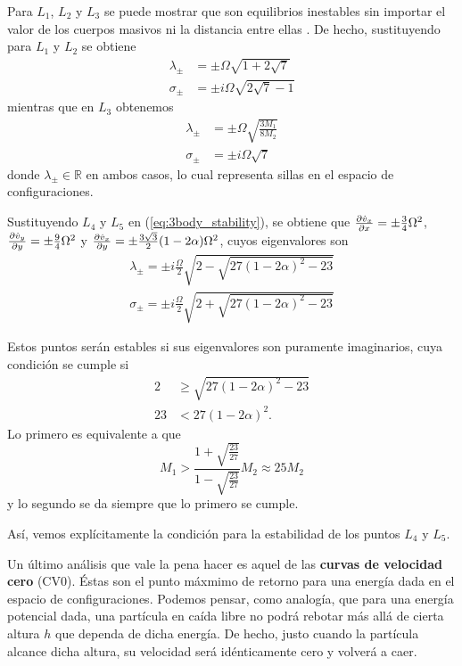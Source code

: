 Para $L_1$, $L_2$ y $L_3$ se puede mostrar que son equilibrios inestables sin importar el valor de los cuerpos masivos ni la distancia entre ellas \cite{algo}. De hecho, sustituyendo para $L_1$ y $L_2$ se obtiene
\begin{align*}
 \lambda_\pm &= \pm \Omega \sqrt{1 + 2\sqrt{7}} \\
 \sigma_\pm &= \pm i \Omega \sqrt{2\sqrt{7} - 1}
\end{align*}
mientras que en $L_3$ obtenemos 
\begin{align*}
 \lambda_\pm &= \pm \Omega \sqrt{ \frac{3M_1}{8M_2} } \\
 \sigma_\pm &= \pm i \Omega \sqrt{7}
\end{align*}
donde $\lambda_\pm \in \mathbb{R}$ en ambos casos, lo cual representa sillas en el espacio de configuraciones.

Sustituyendo $L_4$ y $L_5$ en (\ref{eq:3body_stability}), se obtiene que $\frac{\partial \dot{v}_x}{\partial x} = \pm \frac{3}{4}\Omega^2$, $\frac{\partial \dot{v}_y}{\partial y} = \pm \frac{9}{4}\Omega^2$ y $\frac{\partial \dot{v}_x}{\partial y} = \pm \frac{3\sqrt{3}}{2} (1-2\alpha) \Omega^2$, cuyos eigenvalores son
\begin{align*}
 \lambda_\pm = \pm i \frac{\Omega}{2} \sqrt{ 2 - \sqrt{27(1-2\alpha)^2 - 23} } \\
 \sigma_\pm = \pm i \frac{\Omega}{2} \sqrt{ 2 + \sqrt{27(1-2\alpha)^2 - 23} } 
 \end{align*}

Estos puntos serán estables si sus eigenvalores son puramente imaginarios, cuya condición se cumple si 
\begin{align*}
 2 &\geq \sqrt{27(1-2\alpha)^2 - 23} \\
 23 &< 27(1-2\alpha)^2.
\end{align*}
Lo primero es equivalente a que 
\begin{equation}
 M_1 > \frac{1 + \sqrt{\frac{23}{27}} }{1 - \sqrt{\frac{23}{27}}}M_2 \approx 25M_2
\end{equation}
y lo segundo se da siempre que lo primero se cumple. 

Así, vemos explícitamente la condición para la estabilidad de los puntos $L_4$ y $L_5$. 

Un último análisis que vale la pena hacer es aquel de las \textbf{curvas de velocidad cero} (CV0). Éstas son el punto máxmimo de retorno para una energía dada en el espacio de configuraciones. Podemos pensar, como analogía, que para una energía potencial dada, una partícula en caída libre no podrá rebotar más allá de cierta altura $h$ que dependa de dicha energía. De hecho, justo cuando la partícula alcance dicha altura, su velocidad será idénticamente cero y volverá a caer. 

